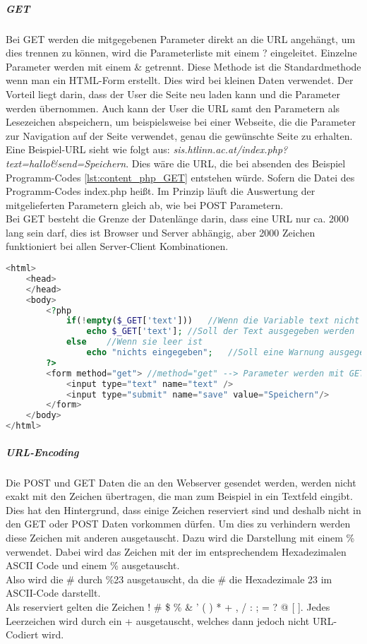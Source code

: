 \subparagraph{GET}
Bei GET werden die mitgegebenen Parameter direkt an die URL angehängt, um dies trennen zu können, wird die Parameterliste mit einem ? eingeleitet. Einzelne Parameter werden mit einem \& getrennt. Diese Methode ist die Standardmethode wenn man ein HTML-Form erstellt. Dies wird bei kleinen Daten verwendet. Der Vorteil liegt darin, dass der User die Seite neu laden kann und die Parameter werden übernommen. Auch kann der User die URL samt den Parametern als Lesezeichen abspeichern, um beispielsweise bei einer Webseite, die die Parameter zur Navigation auf der Seite verwendet, genau die gewünschte Seite zu erhalten. Eine Beispiel-URL sieht wie folgt aus: \textit{sis.htlinn.ac.at/index.php?text=hallo\&send=Speichern}. Dies wäre die URL, die bei absenden des Beispiel Programm-Codes \ref{lst:content_php_GET} entstehen würde. Sofern die Datei des Programm-Codes index.php heißt. Im Prinzip läuft die Auswertung der mitgelieferten Parametern gleich ab, wie bei POST Parametern.\\
Bei GET besteht die Grenze der Datenlänge darin, dass eine URL nur ca. 2000 lang sein darf, dies ist Browser und Server abhängig, aber 2000 Zeichen funktioniert bei allen Server-Client Kombinationen.
\begin{lstlisting}[style=custom, language=PHP,  caption={Beispiel GET},label={lst:content_php_GET}]
<html>
	<head>
	</head>
	<body>
		<?php
			if(!empty($_GET['text']))	//Wenn die Variable text nicht leer ist
				echo $_GET['text'];	//Soll der Text ausgegeben werden
			else	//Wenn sie leer ist
				echo "nichts eingegeben";	//Soll eine Warnung ausgegeben werden
		?>
		<form method="get">	//method="get" --> Parameter werden mit GET mitgegeben
			<input type="text" name="text" />
			<input type="submit" name="save" value="Speichern"/>
		</form>
	</body>
</html>
\end{lstlisting}
\subparagraph{URL-Encoding}
Die POST und GET Daten die an den Webserver gesendet werden, werden nicht exakt mit den Zeichen übertragen, die man zum Beispiel in ein Textfeld eingibt. Dies hat den Hintergrund, dass einige Zeichen reserviert sind und deshalb nicht in den GET oder POST Daten vorkommen dürfen. Um dies zu verhindern werden diese Zeichen mit anderen ausgetauscht. Dazu wird die Darstellung mit einem \% verwendet. Dabei wird das Zeichen mit der im entsprechendem Hexadezimalen ASCII Code und einem \% ausgetauscht.\\
Also wird die \# durch \%23 ausgetauscht, da die \# die Hexadezimale 23 im ASCII-Code darstellt.\\
Als reserviert gelten die Zeichen ! \# \$ \% \& ' ( ) * + , / : ; = ? @ [ ]. Jedes Leerzeichen wird durch ein + ausgetauscht, welches dann jedoch nicht URL-Codiert wird.

